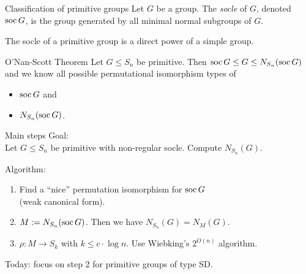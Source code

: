 \documentclass{beamer}
\theoremstyle{plain}
\theoremstyle{definition}
\begin{document}

\begin{frame}{Classification of primitive groups}
Let $G$ be a group. The \emph{socle} of $G$, denoted $\operatorname{soc} G$,
is the group generated by all minimal normal subgroups of $G$.

The socle of a primitive group is a direct power of a simple group.
\pause
\begin{block}{O'Nan-Scott Theorem}
    Let $G \leq S_n$ be primitive.
    Then $\operatorname{soc} G \leq G \leq N_{S_n}(\operatorname{soc} G)$
    and we know all possible permutational isomorphism types of
    \vspace{-0.5em}
    \begin{itemize}
        \item
        $\operatorname{soc} G$ and
        \item
        $N_{S_n}(\operatorname{soc} G)$.
    \end{itemize}
\end{block}
\end{frame}


\begin{frame}{Main steps}
Goal:
\\
Let $G \leq S_n$ be primitive with non-regular socle.
Compute $N_{S_n}(G)$.

Algorithm:
\begin{enumerate}
\item Find a ``nice'' permutation isomorphism for $\operatorname{soc} G$
\\
(weak canonical form).

\item $M := N_{S_n}(\operatorname{soc} G)$.
Then we have $N_{S_n}(G) = N_M(G)$.

\item
$
    \rho : M \to S_k
$
with $k \leq c \cdot \log n$.
Use Wiebking's $2 ^ {O(n)}$ algorithm.
\end{enumerate}
\vspace{1em}

\pause
Today: focus on step 2 for primitive groups of type SD.
\end{frame}

\end{document}
